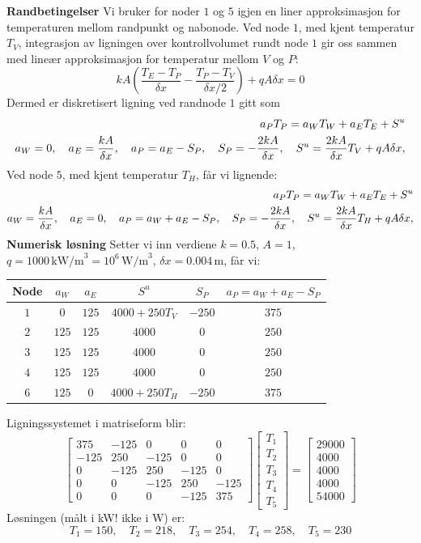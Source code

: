 \textbf{Randbetingelser} Vi bruker for noder $1$ og $5$ igjen en liner approksimasjon for temperaturen mellom randpunkt og nabonode. Ved node $1$, med kjent temperatur $T_V$, integrasjon av ligningen over kontrollvolumet rundt node $1$ gir oss sammen med lineær approksimasjon for temperatur mellom $V$ og $P$:
\[kA \left(\frac{T_E-T_P}{\delta x}- \frac{T_P-T_V}{\delta x/2}\right)+qA\delta x=0\]
Dermed er diskretisert ligning ved randnode $1$ gitt som  
\begin{align}
a_P T_P = a_WT_W + a_E T_E + S^u\\
a_W = 0, \quad a_E = \frac{kA}{\delta x}, \quad a_P = a_E - S_P, \quad S_P = -\frac{2kA}{\delta x}, \quad S^u = \frac{2kA}{\delta x} T_V + q A \delta x, \notag
\end{align}
Ved node $5$, med kjent temperatur $T_H$, får vi lignende:
\begin{align}
a_P T_P = a_W T_W + a_ET_E + S^u\\
a_W = \frac{kA}{\delta x}, \quad a_E = 0, \quad a_P = a_W +a_E- S_P, \quad S_P = -\frac{2kA}{\delta x},    \quad S^u = \frac{2kA}{\delta x} T_H + q A \delta x, \notag
\end{align}
\textbf{Numerisk løsning}
Setter vi inn verdiene $k = 0.5$, $A = 1$, $q = 1000\,\text{kW/m}^3 = 10^6\,\text{W/m}^3$, $\delta x = 0.004\,\text{m}$, får vi:
\begin{center}
\begin{tabular}{|c|c|c|c|c|c|}
\hline
Node & $a_W$ & $a_E$ & $S^u$ & $S_P$ & $a_P=a_W+a_E-S_P$ \\
\hline
$1$ & $0$ & $125$ & $4000+250T_V$ & $-250$ & $375$ \\
$2$ & $125$ & $125$ &   $4000$ &  $0$ & $250$ \\
$3$ & $125$ & $125$ &   $4000$ &  $0$ & $250$ \\
$4$ & $125$ & $125$ &   $4000$ &  $0$ & $250$ \\
$6$ & $125$ & $0$ &  $4000 + 250T_H$ & $-250$ & $375$ \\
\hline
\end{tabular}
\end{center}
Ligningssystemet i matriseform blir:
\[
\begin{bmatrix}
375 & -125 & 0 & 0&0 \\
-125 & 250 & -125 & 0 & 0 \\
0& -125& 250 & -125 & 0\\
0&0&-125& 250 &-125 \\
0&0&0&-125&375
\end{bmatrix}
\begin{bmatrix} T_1 \\ T_2 \\ T_3 \\ T_4 \\ T_5 \end{bmatrix} = \begin{bmatrix} 
29000\\ 4000 \\ 4000 \\ 4000 \\ 54000\end{bmatrix}
\]
Løsningen (målt i kW! ikke i W) er:
\[
T_1 = 150, \quad T_2 = 218, \quad T_3 = 254, \quad T_4 = 258, \quad T_5 = 230
\]

